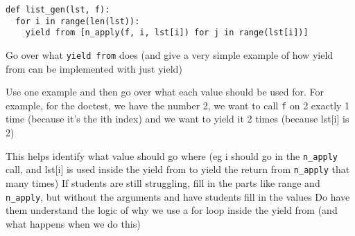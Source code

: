 \begin{parts}
\begin{solution}
\begin{lstlisting}
def list_gen(lst, f):
  for i in range(len(lst)):
    yield from [n_apply(f, i, lst[i]) for j in range(lst[i])]
\end{lstlisting}
\end{solution}
\begin{guide}
Go over what \texttt{yield from} does (and give a very simple example of how yield from can be implemented with just yield)

Use one example and then go over what each value should be used for.
For example, for the doctest, we have the number 2, we want to call \texttt{f} on 2 exactly 1 time (because it’s the ith index) and we want to yield it 2 times (because lst[i] is 2)

This helps identify what value should go where (eg i should go in the \texttt{n\_apply} call, and lst[i] is used inside the yield from to yield the return from \texttt{n\_apply} that many times)
If students are still struggling, fill in the parts like range and \texttt{n\_apply}, but without the arguments and have students fill in the values
Do have them understand the logic of why we use a for loop inside the yield from (and what happens when we do this)

\end{guide}
\end{parts}
